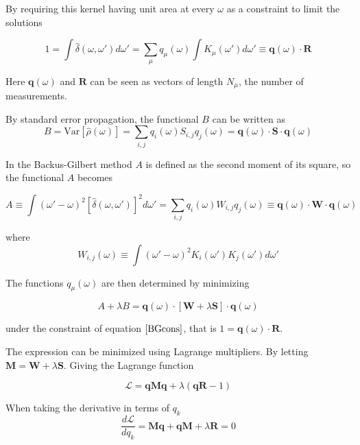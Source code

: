 \documentclass[a4paper, oneside, 12pt]{book}
\begin{document}
By requiring this kernel having unit area at every $\omega$ as a constraint to limit the solutions

\begin{equation}
\label{BGcons}
1=\int \hat{\delta}(\omega,\omega')d\omega'=\sum_{\mu}q_{\mu}(\omega)\int K_{\mu}(\omega')d\omega' \equiv \textbf{q}(\omega)\cdot \textbf{R}
\end{equation}

Here $\textbf{q}(\omega)$ and $\textbf{R}$ can be seen as vectors of length $N_{\mu}$, the number of measurements. 

By standard error propagation, the functional $B$ can be written as
\begin{equation}
B=\mathrm{Var}[\hat{\rho}(\omega)]=\sum_{i,j}q_{i}(\omega)S_{i,j}q_{j}(\omega)= \textbf{q}(\omega)\cdot \textbf{S} \cdot \textbf{q}(\omega)
\end{equation}

In the Backus-Gilbert method $A$ is defined as the second moment of its square, so the functional $A$ becomes

\begin{equation}
A \equiv \int (\omega'-\omega)^{2} [\hat{\delta}(\omega,\omega')]^{2}d\omega'=\sum_{i,j}q_{i}(\omega)W_{i,j}q_{j}(\omega) \equiv \textbf{q}(\omega)\cdot \textbf{W} \cdot \textbf{q}(\omega)
\end{equation}

where
\begin{equation}
W_{i,j}(\omega) \equiv \int (\omega'-\omega)^{2} K_{i}(\omega')K_{j}(\omega')d\omega'
\end{equation}

The functions $q_{\mu}(\omega)$ are then determined by minimizing

\begin{equation}
A+\lambda B = \textbf{q}(\omega)\cdot [\textbf{W}+\lambda\textbf{S}] \cdot \textbf{q}(\omega)
\end{equation}

under the constraint of equation $\ref{BGcons}$, that is $1=\textbf{q}(\omega)\cdot\textbf{R}$.

The expression can be minimized using Lagrange multipliers. By letting $\textbf{M}=\textbf{W}+\lambda \textbf{S}$. Giving the Lagrange function

\begin{equation}
\mathcal{L} = \textbf{qMq}+\lambda (\textbf{qR}-1)
\end{equation}

When taking the derivative in terms of $q_{k}$
\begin{equation}
\frac{d \mathcal{L}}{d q_{k}} = \textbf{Mq}+ \textbf{qM}+ \lambda \textbf{R}=0
\end{equation}
\end{document}
